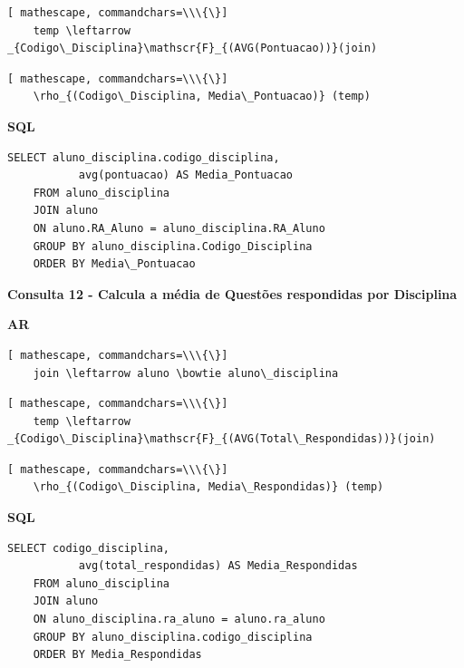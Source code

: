 \documentclass[12pt,a4paper]{article}
\begin{document}
\begin{Verbatim}[ mathescape, commandchars=\\\{\}]
    temp \leftarrow _{Codigo\_Disciplina}\mathscr{F}_{(AVG(Pontuacao))}(join)
\end{Verbatim}

\begin{Verbatim}[ mathescape, commandchars=\\\{\}]
    \rho_{(Codigo\_Disciplina, Media\_Pontuacao)} (temp) 
\end{Verbatim}

\begin{center}
    \textbf{SQL}
\end{center}
\begin{Verbatim}[commandchars=\\\{\}]
    SELECT aluno_disciplina.codigo_disciplina, 
           avg(pontuacao) AS Media_Pontuacao
    FROM aluno_disciplina
    JOIN aluno
    ON aluno.RA_Aluno = aluno_disciplina.RA_Aluno
    GROUP BY aluno_disciplina.Codigo_Disciplina
    ORDER BY Media\_Pontuacao
\end{Verbatim}

\vspace{0.5cm}
\begin{center}
    \textbf{Consulta 12 - Calcula a média de Questões respondidas por Disciplina }
\end{center}
\begin{center}
    \textbf{AR}
\end{center}

\begin{Verbatim}[ mathescape, commandchars=\\\{\}]
    join \leftarrow aluno \bowtie aluno\_disciplina
\end{Verbatim}

\begin{Verbatim}[ mathescape, commandchars=\\\{\}]
    temp \leftarrow _{Codigo\_Disciplina}\mathscr{F}_{(AVG(Total\_Respondidas))}(join)
\end{Verbatim}

\begin{Verbatim}[ mathescape, commandchars=\\\{\}]
    \rho_{(Codigo\_Disciplina, Media\_Respondidas)} (temp) 
\end{Verbatim}


\begin{center}
    \textbf{SQL}
\end{center}
\begin{Verbatim}[commandchars=\\\{\}]
    SELECT codigo_disciplina,
           avg(total_respondidas) AS Media_Respondidas
    FROM aluno_disciplina 
    JOIN aluno
    ON aluno_disciplina.ra_aluno = aluno.ra_aluno
    GROUP BY aluno_disciplina.codigo_disciplina
    ORDER BY Media_Respondidas
\end{Verbatim}
\end{document}
